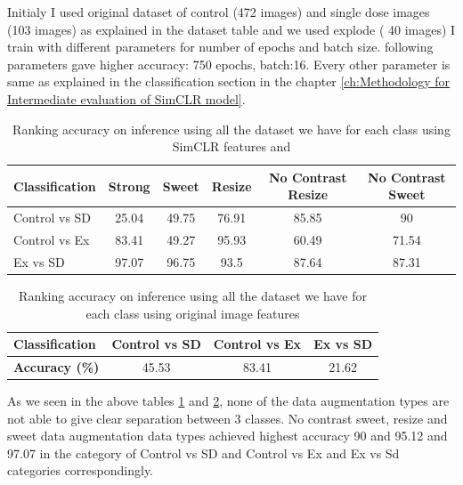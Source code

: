 Initialy I used original dataset of control (472 images) and single dose images (103 images) as explained in the dataset table and we used explode ( 40 images) 
I train with different parameters for  number of epochs and batch size. following parameters gave higher accuracy: 750 epochs, batch:16. Every other parameter is same as explained in the classification section in the chapter \ref{ch:Methodology for Intermediate evaluation of SimCLR model}.


\begin{table}[H]
  \centering
  \begin{tabular}{@{}lccccc@{}}
  \toprule
  \textbf{Classification} & \textbf{Strong} & \textbf{Sweet} & \textbf{Resize} & \textbf{No Contrast Resize} & \textbf{No Contrast Sweet} \\ \midrule
  Control vs SD             & 25.04            & 49.75           & 76.91          & 85.85                         & 90                        \\
  Control vs Ex             & 83.41            & 49.27               & 95.93           & 60.49                          &    71.54                 \\
  Ex vs SD                & 97.07           & 96.75          & 93.5           & 87.64                       & 87.31                        \\ \bottomrule
  \end{tabular}
  \caption{Ranking accuracy on inference using all the dataset we have for each class using SimCLR features and}
  \label{tab:ranking_softmax}
\end{table}

\begin{table}[H]
  \centering
  \begin{tabular}{@{}lccc@{}}
  \toprule
  \textbf{Classification}     & \textbf{Control vs SD} & \textbf{Control vs Ex} & \textbf{Ex vs SD} \\ \midrule
  \textbf{Accuracy (\%)}      & 45.53                  & 83.41                  & 21.62             \\ \bottomrule
  \end{tabular}
  \caption{Ranking accuracy on inference using all the dataset we have for each class using original image features}
  \label{tab:classification_accuracies}
  \end{table}
  
As we seen in the above tables \ref{tab:ranking_softmax} and \ref{tab:classification_accuracies}, none of the  data augmentation types are not able to give clear separation between 3 classes. No contrast sweet, resize and sweet data augmentation data types achieved highest accuracy 90 and 95.12 and 97.07  in the category of  Control vs SD and Control vs Ex and Ex vs Sd categories correspondingly. 

